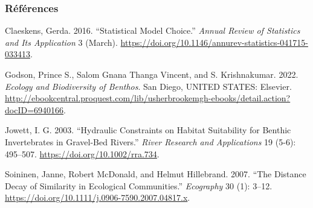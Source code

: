 \documentclass[
]{article}
\newlength{\cslhangindent}
\newlength{\cslentryspacingunit} %
\newenvironment{CSLReferences}[2] %
 {%
  \setlength{\parindent}{0pt}
  \ifodd #1
  \let\oldpar\par
  \def\par{\hangindent=\cslhangindent\oldpar}
  \fi
  \setlength{\parskip}{#2\cslentryspacingunit}
 }%
 {}
\begin{document}
\hypertarget{ruxe9fuxe9rences}{%
\subsubsection*{Références}\label{ruxe9fuxe9rences}}

\hypertarget{refs}{}
\begin{CSLReferences}{1}{0}
\leavevmode{}%
Claeskens, Gerda. 2016. {``Statistical {Model} {Choice}.''} \emph{Annual
Review of Statistics and Its Application} 3 (March).
\url{https://doi.org/10.1146/annurev-statistics-041715-033413}.

\leavevmode{}%
Godson, Prince S., Salom Gnana Thanga Vincent, and S. Krishnakumar.
2022. \emph{Ecology and {Biodiversity} of {Benthos}}. San Diego, UNITED
STATES: Elsevier.
\url{http://ebookcentral.proquest.com/lib/usherbrookemgh-ebooks/detail.action?docID=6940166}.

\leavevmode{}%
Jowett, I. G. 2003. {``Hydraulic Constraints on Habitat Suitability for
Benthic Invertebrates in Gravel-Bed Rivers.''} \emph{River Research and
Applications} 19 (5-6): 495--507. \url{https://doi.org/10.1002/rra.734}.

\leavevmode{}%
Soininen, Janne, Robert McDonald, and Helmut Hillebrand. 2007. {``The
Distance Decay of Similarity in Ecological Communities.''}
\emph{Ecography} 30 (1): 3--12.
\url{https://doi.org/10.1111/j.0906-7590.2007.04817.x}.

\end{CSLReferences}
\end{document}
